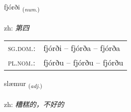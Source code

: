 \documentclass[frontgrid, backgrid]{flacards}\usepackage[]{graphicx}\usepackage[]{color}
\begin{document}
\renewcommand{\flhead}{\vskip5pt \fboxsep=0pt {\small\bfseries\footnotesize Töluorð | 数量词}}
\renewcommand{\fcfoot}{\vskip5pt \fboxsep=0pt \hspace{2pt}{\small\bfseries\footnotesize 2K}}

\renewcommand{\blhead}{\vskip5pt {\small\bfseries\footnotesize Töluorð | 数量词 }}
\renewcommand{\bcfoot}{\vskip5pt \hspace{2pt}{\small\bfseries\footnotesize 2K}}


{fjórði \small{\textsubscript{(\textit{num.})}} \\[1ex] %
\textphonetic{[fjourðɪ]} \\
zh: \emph{第四} \\  [2ex]
\renewcommand*{\arraystretch}{0.8}
\begin{tabular}{ll}
\textsc{sg.dom.}: & fjórði  --  fjórða -- fjórða \\ 
\textsc{pl.nom.}: & fjórðu -- fjórðu -- fjórðu
\end{tabular}
}

\renewcommand{\flhead}{\vskip5pt \fboxsep=0pt {\small\bfseries\footnotesize Lýsingarorð | 形容词}}
\renewcommand{\fcfoot}{\vskip5pt \fboxsep=0pt \hspace{2pt}{\small\bfseries\footnotesize 2K}}

\renewcommand{\blhead}{\vskip5pt {\small\bfseries\footnotesize Lýsingarorð | 形容词 }}
\renewcommand{\bcfoot}{\vskip5pt \hspace{2pt}{\small\bfseries\footnotesize 2K}}


{slæmur \small{\textsubscript{(\textit{adj.})}} \\[1ex] %
\textphonetic{[stlaiːmʏr]} \\
zh: \emph{糟糕的，不好的} \\  [2ex]
\renewcommand*{\arraystretch}{0.8}
}
\end{document}
